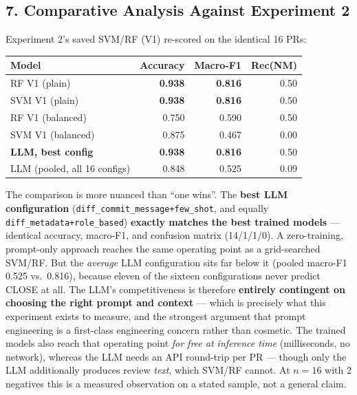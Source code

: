 \documentclass{experimentreport}
\begin{document}
{\subsection*{7. Comparative Analysis Against Experiment 2}

Experiment 2's saved SVM/RF (V1) re-scored on the identical 16 PRs:

\begin{center}
\begin{tabular}{|l|r|r|r|}
\hline
\textbf{Model} & \textbf{Accuracy} & \textbf{Macro-F1} & \textbf{Rec(NM)} \\
\hline
RF V1 (plain)          & \textbf{0.938} & \textbf{0.816} & 0.50 \\
SVM V1 (plain)         & \textbf{0.938} & \textbf{0.816} & 0.50 \\
RF V1 (balanced)       & 0.750 & 0.590 & 0.50 \\
SVM V1 (balanced)      & 0.875 & 0.467 & 0.00 \\
\hline
\textbf{LLM, best config} & \textbf{0.938} & \textbf{0.816} & 0.50 \\
LLM (pooled, all 16 configs) & 0.848 & 0.525 & 0.09 \\
\hline
\end{tabular}
\end{center}
\noindent The comparison is more nuanced than ``one wins''. The \textbf{best LLM configuration}
(\texttt{diff\_commit\_message+few\_shot}, and equally \texttt{diff\_metadata+role\_based})
\textbf{exactly matches the best trained models} --- identical accuracy, macro-F1, and confusion
matrix (14/1/1/0). A zero-training, prompt-only approach reaches the same operating point as a
grid-searched SVM/RF. But the \emph{average} LLM configuration sits far below it (pooled macro-F1
0.525 vs.\ 0.816), because eleven of the sixteen configurations never predict CLOSE at all. The
LLM's competitiveness is therefore \textbf{entirely contingent on choosing the right prompt and
context} --- which is precisely what this experiment exists to measure, and the strongest argument
that prompt engineering is a first-class engineering concern rather than cosmetic. The trained
models also reach that operating point \emph{for free at inference time} (milliseconds, no network),
whereas the LLM needs an API round-trip per PR --- though only the LLM additionally produces review
\emph{text}, which SVM/RF cannot. At $n{=}16$ with 2 negatives this is a measured observation on a
stated sample, not a general claim.

}
\end{document}
